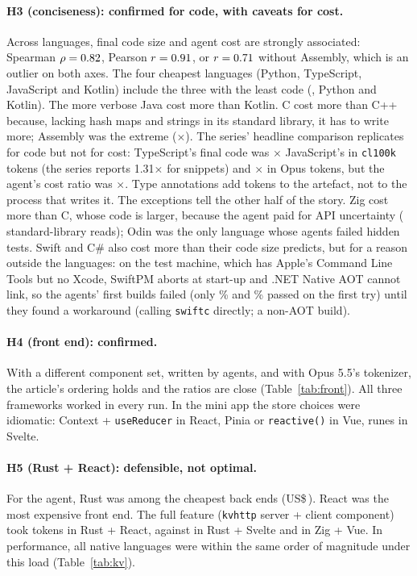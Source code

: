 \documentclass[11pt,a4paper]{article}
\begin{document}
\paragraph{H3 (conciseness): confirmed for code, with caveats for cost.} Across languages, final code
size and agent cost are strongly associated: Spearman $\rho = 0.82$, Pearson $r =
0.91$, or $r = 0.71$ without Assembly, which is an outlier on both axes. The four
cheapest languages (Python, TypeScript, JavaScript and Kotlin) include the three with the least code
(\ShortestLang, Python and Kotlin). The more verbose Java cost more than Kotlin. C cost more than C++
because, lacking hash maps and strings in its standard library, it has to write more; Assembly was the
extreme (\RatioAsm$\times$). The series' headline comparison replicates for code but not for cost:
TypeScript's final code was \TsJsCodeClk$\times$ JavaScript's in \texttt{cl100k} tokens (the series
reports 1.31$\times$ for snippets) and \TsJsCode$\times$ in Opus tokens, but the agent's cost ratio was
\TsJsCost$\times$. Type annotations add tokens to the artefact, not to the process that writes it. The
exceptions tell the other half of the story. Zig cost more than C, whose code is larger, because the agent paid for API uncertainty
(\StdZig{} standard-library reads); Odin was the only language whose agents failed hidden tests. Swift
and C\# also cost more than their code size predicts, but for a reason outside the languages: on the test
machine, which has Apple's Command Line Tools but no Xcode, SwiftPM aborts at start-up and .NET Native AOT
cannot link, so the agents' first builds failed (only \FirstSwift\% and \FirstCsharp\% passed on the
first try) until they found a workaround (calling \texttt{swiftc} directly; a non-AOT build).

\paragraph{H4 (front end): confirmed.} With a different component set, written by agents, and with
Opus 5.5's tokenizer, the article's ordering holds and the ratios are close (Table~\ref{tab:front}). All
three frameworks worked in every run. In the mini app the store choices were idiomatic: Context +
\texttt{useReducer} in React, Pinia or \texttt{reactive()} in Vue, runes in Svelte.

\paragraph{H5 (Rust + React): defensible, not optimal.} For the agent, Rust was among the cheapest back
ends (US\$\,\CostRust). React was the most expensive front end. The full feature (\texttt{kvhttp} server
+ client component) took \ComboRustReact{} tokens in Rust + React, against \ComboRustSvelte{} in Rust +
Svelte and \ComboZigVue{} in Zig + Vue. In performance, all native languages were within the same order
of magnitude under this load (Table~\ref{tab:kv}).
\end{document}

